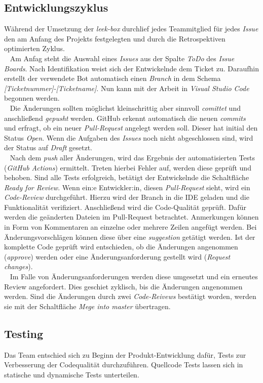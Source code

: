 \documentclass[10pt, a4paper]{article}
\begin{document}
\subsection{Entwicklungszyklus}
Während der Umsetzung der \textit{leek-box} durchlief jedes Teammitglied für jedes \textit{Issue} den am Anfang des Projekts festgelegten und
durch die Retrospektiven optimierten Zyklus.
\\~
Am Anfag steht die Auswahl eines \textit{Issues} aus der Spalte \textit{ToDo} des \textit{Issue Boards}.
Nach Identifikation weist sich der Entwickelnde dem Ticket zu. Daraufhin erstellt der verwendete Bot automatisch einen \textit{Branch}
in dem Schema \textit{[Ticketnummer]-[Ticketname]}. Nun kann mit der Arbeit in \textit{Visual Studio Code} begonnen werden.
\\~
Die Änderungen sollten möglichst kleinschrittig aber sinnvoll \textit{comittet} und anschließend \textit{gepusht} werden.
GitHub erkennt automatisch die neuen \textit{commits} und erfragt, ob ein neuer \textit{Pull-Request} angelegt werden soll.
Dieser hat initial den Status \textit{Open}.
Wenn die Aufgaben des \textit{Issues} noch nicht abgeschlossen sind, wird der Status auf \textit{Draft} gesetzt.
\\~
Nach dem \textit{push} aller Änderungen, wird das Ergebnis der automatisierten Tests (\textit{GitHub Actions}) ermittelt. Treten hierbei Fehler auf,
werden diese geprüft und behoben. Sind alle Tests erfolgreich, betätigt der Entwickelnde die Schaltfläche \textit{Ready for Review}.
Wenn ein:e Entwickler:in, diesen \textit{Pull-Request} sieht, wird ein \textit{Code-Review} durchgeführt.
Hierzu wird der Branch in die IDE geladen und die Funktionalität verifiziert. Anschließend wird die Code-Qualität geprüft.
Dafür werden die geänderten Dateien im Pull-Request betrachtet. Anmerkungen können in Form
von Kommentaren an einzelne oder mehrere Zeilen angefügt werden. Bei Änderungsvorschlägen können diese über eine \textit{suggestion}
getätigt werden. Ist der komplette Code geprüft wird entschieden,
ob die Änderungen angenommen (\textit{approve}) werden oder eine Änderungsanforderung gestellt wird (\textit{Request changes}).
\\~
Im Falle von Änderungsanforderungen werden diese umgesetzt und ein erneutes Review angefordert. Dies geschiet zyklisch, bis die Änderungen angenommen werden.
Sind die Änderungen durch zwei \textit{Code-Reivews} bestätigt worden, werden sie mit der Schaltfläche \textit{Mege into master} übertragen.

\subsection{Testing}
Das Team entschied sich zu Beginn der Produkt-Entwicklung dafür, Tests zur Verbesserung der Codequalität durchzuführen.
Quellcode Tests lassen sich in statische und dynamische Tests unterteilen.
\end{document}
